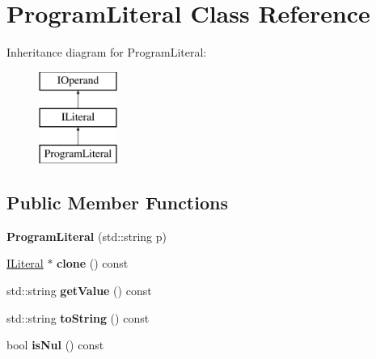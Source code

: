 \hypertarget{class_program_literal}{}\section{Program\+Literal Class Reference}
\label{class_program_literal}
Inheritance diagram for Program\+Literal\+:\begin{figure}[H]
\begin{center}
\leavevmode
\includegraphics[height=3.000000cm]{class_program_literal}
\end{center}
\end{figure}
\subsection*{Public Member Functions}
\begin{DoxyCompactItemize}
\item 
{\bfseries Program\+Literal} (std\+::string p)\hypertarget{class_program_literal_a19ac6600917aa34bf41374f9b77c5400}{}\label{class_program_literal_a19ac6600917aa34bf41374f9b77c5400}

\item 
\hyperlink{class_i_literal}{I\+Literal} $\ast$ {\bfseries clone} () const \hypertarget{class_program_literal_a19b986a859b88240600e444ad8534437}{}\label{class_program_literal_a19b986a859b88240600e444ad8534437}

\item 
std\+::string {\bfseries get\+Value} () const \hypertarget{class_program_literal_ae2b1010037bbd8991c937a2eda623ad6}{}\label{class_program_literal_ae2b1010037bbd8991c937a2eda623ad6}

\item 
std\+::string {\bfseries to\+String} () const \hypertarget{class_program_literal_a8ad99a9d8755d1637e30b79ae55f7f25}{}\label{class_program_literal_a8ad99a9d8755d1637e30b79ae55f7f25}

\item 
bool {\bfseries is\+Nul} () const \hypertarget{class_program_literal_ad12118745d3b3d30d700a7fcca02d4d7}{}\label{class_program_literal_ad12118745d3b3d30d700a7fcca02d4d7}

\end{DoxyCompactItemize}
